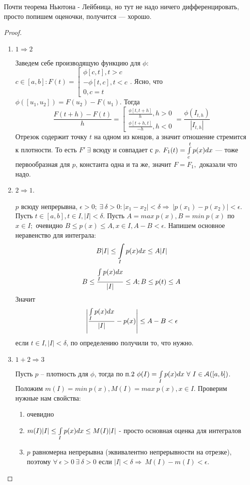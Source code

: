 \documentclass[12pt]{report}
\begin{document}
\begin{note}
Почти теорема Ньютона - Лейбница, но тут не надо ничего дифференцировать, просто попишем оценочки, получится --- хорошо.
\end{note}

\begin{proof}
\begin{enumerate}
\item $1 \Rightarrow 2$

Заведем себе производящую функцию для $\phi$: $c \in [a, b]: F(t) = \left[
\begin{matrix}
\phi[c, t], t > c\\
-\phi[t, c], t < c\\
0, c = t
\end{matrix}\right.
$. Ясно, что $\phi([u_1, u_2]) = F(u_2) - F(u_1)$. Тогда 
$$\frac{F(t + h) - F(t)}{h} = \left[
\begin{matrix}
\frac{\phi[t, t + h]}{h}, h > 0\\
\frac{\phi[t + h, t]}{- h}, h < 0
\end{matrix}\right. = \frac{\phi(I_{t, h})}{|I_{t, h}|}
$$
Отрезок содержит точку $t$ на одном из концов, а значит отношение стремится к плотности. То есть $F' ~\exists$ всюду и совпадает с $p$. $F_1(t) = \int\limits_c^t{p(x)dx}$ --- тоже первообразная для $p$, константа одна и та же, значит $F = F_1,$ доказали что надо.

\item $2 \Rightarrow 1$. 

$p$ всюду непрерывна, $\epsilon > 0; ~\exists ~\delta > 0: |x_1 - x_2| < \delta \Rightarrow ~|p(x_1) - p(x_2)| < \epsilon$. Пусть $t \in [a, b], t \in I, |I| < \delta$. Пусть $A = max ~p(x), B = min ~p(x)$ по $x \in I;$ очевидно $B \le p(x) \le A, x \in I, A - B < \epsilon$. Напишем основное неравенство для интеграла:
$$B|I| \le \int\limits_I{p(x)dx} \le A|I|$$
$$B \le \frac{\int\limits_I{p(x)dx}}{|I|} \le A; B \le p(t) \le A$$
Значит 
$$\left| \frac{\int\limits_I{p(x)dx}}{|I|} - p(x) \right| \le A - B < \epsilon$$
если $t \in I, |I| < \delta$, по определению получили то, что нужно.

\item $1 + 2 \Rightarrow 3$

Пусть $p$ -- плотность для $\phi$, тогда по п.$2 ~\phi(I) = \int\limits_I{p(x)dx} ~\forall ~I \in \EuScript A([a, b])$. Положим $m(I) = min ~p(x), M(I) = max ~p(x), x \in I$. Проверим нужные нам свойства:
\begin{enumerate}
\item очевидно
\item $m(I)|I| \le \int\limits_I{p(x)dx} \le M(I)|I|$ - просто основная оценка для интегралов
\item $p$ равномерна непрерывна (эквивалентно непрерывности на отрезке), поэтому $\forall ~\epsilon > 0 ~\exists ~\delta > 0$ если $|I| < \delta \Rightarrow ~M(I) - m(I) < \epsilon$.
\end{enumerate}


\end{enumerate}
\end{proof}
\end{document}
